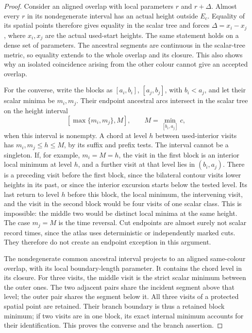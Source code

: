 \documentclass[11pt]{article}
\numberwithin{equation}{section}
\theoremstyle{definition}
\theoremstyle{remark}
\newcommand{\1}{\mathbf 1}
\begin{document}
\begin{proof}
Consider an aligned overlap with local parameters \(r\) and
\(r+\Delta\).  Almost every \(r\) in its nondegenerate interval
has an actual height outside \(E_c\).  Equality of its spatial points
therefore gives equality in the scalar tree and forces
\(\Delta=x_i-x_j\), where \(x_i,x_j\) are the actual used-start
heights.  The same statement holds on a dense set of parameters.
The ancestral segments are continuous in the scalar-tree metric,
so equality extends to the whole overlap and its closure.  This
also shows why an isolated coincidence arising from the other
colour cannot give an accepted overlap.

For the converse, write the blocks as \([a_i,b_i]\),
\([a_j,b_j]\), with \(b_i<a_j\), and let their scalar minima be
\(m_i,m_j\).  Their endpoint ancestral arcs intersect in the scalar
tree on the height interval
\[
 [\max\{m_i,m_j\},M],\qquad
 M=\min_{[b_i,a_j]}c,
\]
when this interval is nonempty.  A chord at level \(h\) between
used-interior visits has \(m_i,m_j\le h\le M\), by its suffix and
prefix tests.  The interval cannot be a singleton.  If, for example,
\(m_i=M=h\), the visit in the first block is an interior local
minimum at level \(h\), and a further visit at that level lies in
\((b_i,a_j)\).  There is a preceding visit before the first block, since the
bilateral contour visits lower heights in its past, or since the
interior excursion starts below the tested level.  Its last return
to level \(h\) before this block, the local minimum, the intervening
visit, and the visit in the second block would be four visits of one
scalar class.  This is impossible:
the middle two would be distinct local minima at the same height.
The case \(m_j=M\) is the time reversal.  Cut endpoints are almost
surely not scalar record times, since the atlas uses deterministic
or independently marked cuts.  They therefore do not create an
endpoint exception in this argument.

The nondegenerate common ancestral interval projects to an aligned
same-colour overlap, with its local boundary-length parameter.
It contains the chord level in its closure.  For three visits,
the middle visit is the strict scalar minimum between the outer
ones.  The two adjacent pairs share the incident segment above
that level; the outer pair shares the segment below it.  All
three visits of a protected spatial point are retained.  Their
branch boundary is thus a retained block minimum; if two visits
are in one block, its exact internal minimum accounts for their
identification.  This proves the converse and the branch assertion.
\end{proof}
\end{document}

